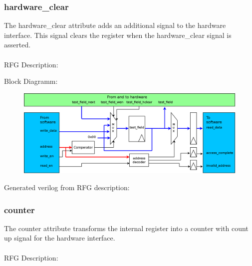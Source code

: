 \documentclass[12pt,a4paper]{article}
\begin{document}
\subsubsection{hardware\_clear}
The hardware\_clear attribute adds an additional signal to the hardware interface. This signal clears the register when the hardware\_clear signal is asserted.\\
\\
RFG Description:


Block Diagramm:
\begin{figure}[h!]
    \includegraphics[width=\textwidth]{pictures/Reg_hrw_srw_hclear.png}
\end{figure}
\newpage
Generated verilog from RFG description:

\newpage

\subsubsection{counter}
The counter attribute transforms the internal register into a counter with count up signal for the hardware interface.\\
\\
RFG Description:

\end{document}
